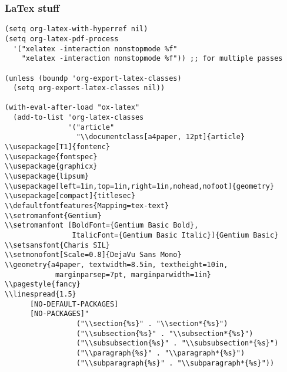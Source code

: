 \documentclass[11pt]{article}
\begin{document}
\subsubsection{LaTex stuff}
\label{sec:org3d74c89}
\begin{verbatim}
(setq org-latex-with-hyperref nil)
(setq org-latex-pdf-process 
  '("xelatex -interaction nonstopmode %f"
    "xelatex -interaction nonstopmode %f")) ;; for multiple passes

(unless (boundp 'org-export-latex-classes)
  (setq org-export-latex-classes nil))

(with-eval-after-load "ox-latex"
  (add-to-list 'org-latex-classes
               '("article"
                 "\\documentclass[a4paper, 12pt]{article}
\\usepackage[T1]{fontenc}
\\usepackage{fontspec}
\\usepackage{graphicx}
\\usepackage{lipsum}
\\usepackage[left=1in,top=1in,right=1in,nohead,nofoot]{geometry}
\\usepackage[compact]{titlesec}
\\defaultfontfeatures{Mapping=tex-text}
\\setromanfont{Gentium}
\\setromanfont [BoldFont={Gentium Basic Bold},
                ItalicFont={Gentium Basic Italic}]{Gentium Basic}
\\setsansfont{Charis SIL}
\\setmonofont[Scale=0.8]{DejaVu Sans Mono}
\\geometry{a4paper, textwidth=8.5in, textheight=10in,
            marginparsep=7pt, marginparwidth=1in}
\\pagestyle{fancy}
\\linespread{1.5}
      [NO-DEFAULT-PACKAGES]
      [NO-PACKAGES]"
                 ("\\section{%s}" . "\\section*{%s}")
                 ("\\subsection{%s}" . "\\subsection*{%s}")
                 ("\\subsubsection{%s}" . "\\subsubsection*{%s}")
                 ("\\paragraph{%s}" . "\\paragraph*{%s}")
                 ("\\subparagraph{%s}" . "\\subparagraph*{%s}"))


\end{verbatim}
\end{document}
